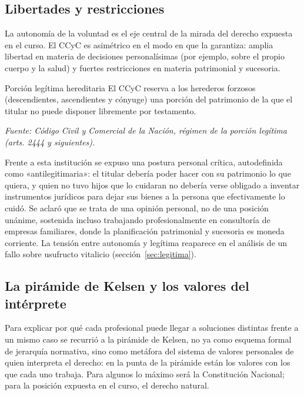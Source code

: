 \documentclass[12pt,oneside]{book}
\begin{document}
\subsection{Libertades y restricciones}

La autonomía de la voluntad es el eje central de la mirada del derecho expuesta en el curso. El CCyC es asimétrico en el modo en que la garantiza: amplia libertad en materia de decisiones personalísimas (por ejemplo, sobre el propio cuerpo y la salud) y fuertes restricciones en materia patrimonial y sucesoria.

\begin{definition}{Porción legítima hereditaria}
El CCyC reserva a los herederos forzosos (descendientes, ascendientes y cónyuge) una porción del patrimonio de la que el titular no puede disponer libremente por testamento.

\textit{Fuente: Código Civil y Comercial de la Nación, régimen de la porción legítima (arts. 2444 y siguientes).}
\end{definition}

Frente a esta institución se expuso una postura personal crítica, autodefinida como «antilegitimaria»: el titular debería poder hacer con su patrimonio lo que quiera, y quien no tuvo hijos que lo cuidaran no debería verse obligado a inventar instrumentos jurídicos para dejar sus bienes a la persona que efectivamente lo cuidó. Se aclaró que se trata de una opinión personal, no de una posición unánime, sostenida incluso trabajando profesionalmente en consultoría de empresas familiares, donde la planificación patrimonial y sucesoria es moneda corriente. La tensión entre autonomía y legítima reaparece en el análisis de un fallo sobre usufructo vitalicio (sección~\ref{sec:legitima}).

\subsection{La pirámide de Kelsen y los valores del intérprete}

Para explicar por qué cada profesional puede llegar a soluciones distintas frente a un mismo caso se recurrió a la pirámide de Kelsen, no ya como esquema formal de jerarquía normativa, sino como metáfora del sistema de valores personales de quien interpreta el derecho: en la punta de la pirámide están los valores con los que cada uno trabaja. Para algunos lo máximo será la Constitución Nacional; para la posición expuesta en el curso, el derecho natural.
\end{document}
